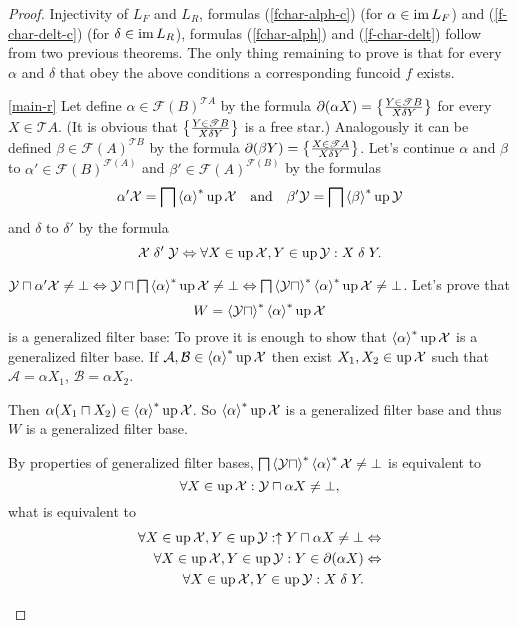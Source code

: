 \begin{proof}
Injectivity of $L_{F}$ and $L_{R}$, formulas (\ref{fchar-alph-c})
(for $\alpha\in\operatorname{im} L_{F}$) and (\ref{f-char-delt-c}) (for $\delta\in\operatorname{im} L_{R}$),
formulas (\ref{fchar-alph}) and (\ref{f-char-delt}) follow from
two previous theorems. The only thing remaining to prove is that for
every $\alpha$ and $\delta$ that obey the above conditions a corresponding
funcoid $f$ exists.
\begin{widedisorder}
\item [{\ref{main-r}}] Let define $\alpha\in\mathscr{F}(B)^{\mathscr{T}A}$
by the formula $\partial(\alpha X)=\left\{ \frac{Y\in\mathscr{T}B}{X\mathrel\delta
Y}\right\}$
for every $X\in\mathscr{T}A$. (It is obvious that
$\left\{ \frac{Y\in\mathscr{T}B}{X\mathrel\delta Y}\right\}$
is a free star.) Analogously it can be defined
$\beta\in\mathscr{F}(A)^{\mathscr{T}B}$
by the formula $\partial(\beta Y)=\left\{ \frac{X\in\mathscr{T}A}{X\mathrel\delta
Y}\right\}$.
Let's continue $\alpha$ and $\beta$ to
$\alpha'\in\mathscr{F}(B)^{\mathscr{F}(A)}$
and $\beta'\in\mathscr{F}(A)^{\mathscr{F}(B)}$ by the formulas
\[
\alpha'\mathcal{X}=\bigsqcap\left\langle \alpha\right\rangle ^{\ast}\operatorname{up}\mathcal{X}\quad\text{and}
\quad\beta'\mathcal{Y}=\bigsqcap\left\langle \beta\right\rangle ^{\ast}\operatorname{up}\mathcal{Y}
\]
and $\delta$ to $\delta'$ by the formula
\[
\mathcal{X}\mathrel{\delta'}\mathcal{Y}\Leftrightarrow\forall
X\in\operatorname{up}\mathcal{X},Y\in\operatorname{up}\mathcal{Y}:X\mathrel\delta Y.
\]



$\mathcal{Y}\sqcap\alpha'\mathcal{X}\ne\bot
\Leftrightarrow\mathcal{Y}\sqcap\bigsqcap\left\langle \alpha\right\rangle ^{\ast}\operatorname{up}\mathcal{X}\ne\bot
\Leftrightarrow\bigsqcap\left\langle \mathcal{Y}\sqcap\right\rangle ^{\ast}\left\langle 
\alpha\right\rangle ^{\ast}\operatorname{up}\mathcal{X}\ne\bot$.
Let's prove that
\[
W=\left\langle \mathcal{Y}\sqcap\right\rangle ^{\ast}\left\langle \alpha\right\rangle ^{\ast}\operatorname{up}\mathcal{X}
\]
is a generalized filter base: To prove it is enough to show that
$\left\langle \alpha\right\rangle ^{\ast}\operatorname{up}\mathcal{X}$
is a generalized filter base. If
$\mathcal{A},\mathcal{B}\in\left\langle \alpha\right\rangle ^{\ast}\operatorname{up}\mathcal{X}$
then exist $X_{1},X_{2}\in\operatorname{up}\mathcal{X}$ such that $\mathcal{A}=\alpha X_{1}$,
$\mathcal{B}=\alpha X_{2}$.


Then $\alpha(X_{1}\sqcap X_{2})\in\left\langle \alpha\right\rangle ^{\ast}\operatorname{up}\mathcal{X}$.
So $\left\langle \alpha\right\rangle ^{\ast}\operatorname{up}\mathcal{X}$ is a generalized filter base
and thus $W$ is a generalized filter base.


By properties of generalized filter bases,
$\bigsqcap\left\langle \mathcal{Y}\sqcap\right\rangle ^{\ast}\left\langle \alpha\right\rangle ^{\ast}\mathcal{X}\ne\bot$
is equivalent to
\[
\forall X\in\operatorname{up}\mathcal{X}:\mathcal{Y}\sqcap\alpha X\ne\bot,
\]
what is equivalent to
\begin{align*}
\forall X\in\operatorname{up}\mathcal{X},Y\in\operatorname{up}\mathcal{Y}:\uparrow Y\sqcap\alpha
X\ne\bot & \Leftrightarrow\\
\forall X\in\operatorname{up}\mathcal{X},Y\in\operatorname{up}\mathcal{Y}:Y\in\partial(\alpha X) &
\Leftrightarrow\\
\forall X\in\operatorname{up}\mathcal{X},Y\in\operatorname{up}\mathcal{Y}:X\mathrel\delta Y.
\end{align*}




\end{widedisorder}
\end{proof}
